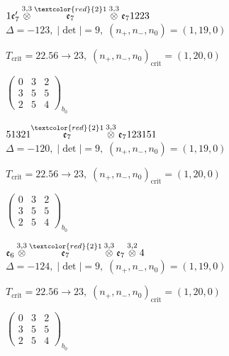 \documentclass[10pt]{article}
\begin{document}
$1\mathfrak{e}_7'\overset{3,3}{\otimes}\overset{\textcolor{red}{2}1}{\mathfrak{e}_7}\overset{3,3}{\otimes}\mathfrak{e}_71223$ \quad $\Delta=-123,\; |\det|=9,\; (n_+,n_-,n_0)=(1,19,0)$

\hspace{1em}$T_{\text{crit}}=22.56 \to 23,\; (n_+,n_-,n_0)_{\text{crit}}=(1,20,0)$

\hspace{2em}$\left(\begin{smallmatrix}0 & 3 & 2 \\ 3 & 5 & 5 \\ 2 & 5 & 4\end{smallmatrix}\right)_{\!b_0}$

\smallskip

$51321\overset{\textcolor{red}{2}1}{\mathfrak{e}_7}\overset{3,3}{\otimes}\mathfrak{e}_7123151$ \quad $\Delta=-120,\; |\det|=9,\; (n_+,n_-,n_0)=(1,19,0)$

\hspace{1em}$T_{\text{crit}}=22.56 \to 23,\; (n_+,n_-,n_0)_{\text{crit}}=(1,20,0)$

\hspace{2em}$\left(\begin{smallmatrix}0 & 3 & 2 \\ 3 & 5 & 5 \\ 2 & 5 & 4\end{smallmatrix}\right)_{\!b_0}$

\smallskip

$\mathfrak{e}_6\overset{3,3}{\otimes}\overset{\textcolor{red}{2}1}{\mathfrak{e}_7}\overset{3,3}{\otimes}\mathfrak{e}_7\overset{3,2}{\otimes}4$ \quad $\Delta=-124,\; |\det|=9,\; (n_+,n_-,n_0)=(1,19,0)$

\hspace{1em}$T_{\text{crit}}=22.56 \to 23,\; (n_+,n_-,n_0)_{\text{crit}}=(1,20,0)$

\hspace{2em}$\left(\begin{smallmatrix}0 & 3 & 2 \\ 3 & 5 & 5 \\ 2 & 5 & 4\end{smallmatrix}\right)_{\!b_0}$

\smallskip
\end{document}
